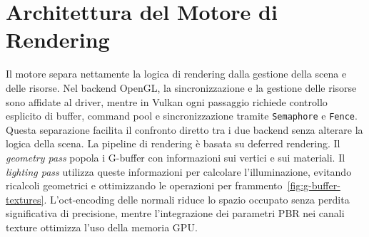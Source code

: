 \documentclass[12pt,a4paper,openright,twoside]{book}
\begin{document}
\section{Architettura del Motore di Rendering}
Il motore separa nettamente la logica di rendering dalla gestione della scena e delle risorse. Nel backend OpenGL,
la sincronizzazione e la gestione delle risorse sono affidate al driver, mentre in Vulkan ogni passaggio richiede controllo
esplicito di buffer, command pool e sincronizzazione tramite \texttt{Semaphore} e \texttt{Fence}. Questa separazione facilita
il confronto diretto tra i due backend senza alterare la logica della scena.
La pipeline di rendering è basata su deferred rendering. Il \emph{geometry pass} popola i G-buffer con informazioni sui
vertici e sui materiali. Il \emph{lighting pass} utilizza queste informazioni per calcolare l’illuminazione, evitando
ricalcoli geometrici e ottimizzando le operazioni per frammento~\ref{fig:g-buffer-textures}. L'oct-encoding delle normali
riduce lo spazio occupato senza perdita significativa di precisione, mentre l’integrazione dei parametri PBR nei canali
texture ottimizza l’uso della memoria GPU.
\end{document}

